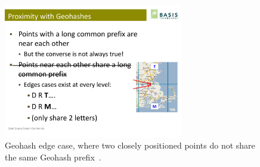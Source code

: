 \begin{figure}[h]
  \begin{center}
    \includegraphics[width=0.7\textwidth]{figures/geohash_edges.pdf}
    \caption{Geohash edge case, where two closely positioned points do not share the same Geohash prefix~\cite{Smiley11geohash}.}
    \label{fig:geohash-edge}
  \end{center}
\end{figure}



























